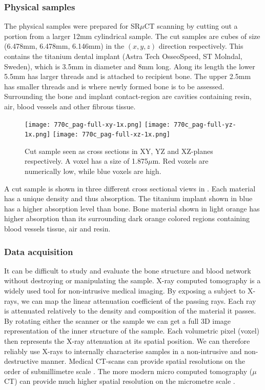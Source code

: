 \subsubsection{Physical samples}

The physical samples were prepared for SR$\mu$CT scanning by cutting out a portion from a larger
12mm cylindrical sample. The cut samples are cubes of size (6.478mm, 6.478mm, 6.146mm) in the
$(x,y,z)$ direction respectively. This contains the titanium dental implant (Astra Tech OsseoSpeed,
ST Molndal, Sweden), which is 3.5mm in diameter and 8mm long. Along its length the lower 5.5mm
has larger threads and is attached to recipient bone. The upper 2.5mm has smaller threads and
is where newly formed bone is to be assessed. Surrounding the bone and implant contact-region
are cavities containing resin, air, blood vessels and other fibrous tissue.

\begin{figure}
\centering
\texttt{[image: 770c\_pag-full-xy-1x.png]}
\texttt{[image: 770c\_pag-full-yz-1x.png]}
\texttt{[image: 770c\_pag-full-xz-1x.png]}
\caption{Cut sample seen as cross sections in XY, YZ and XZ-planes respectively. A voxel has a size
of 1.875$\mu$m. Red voxels are numerically low, while blue voxels are high.}
\label{fig:3viewsample}
\end{figure}

A cut sample is shown in three different cross sectional views in . Each
material has a unique density and thus absorption. The titanium implant shown in blue has a
higher absorption level than bone. Bone material shown in light orange has higher absorption
than its surrounding dark orange colored regions containing blood vessels tissue, air and resin.

\subsubsection{Data acquisition}

It can be difficult to study and evaluate the bone structure and blood network without destroying
or manipulating the sample. X-ray computed tomography is a widely used tool for non-intrusive medical
imaging. By exposing a subject to X-rays, we can map the linear attenuation coefficient of the passing
rays. Each ray is attenuated relatively to the density and composition of the material it passes.
By rotating either the scanner or the sample we can get a full 3D image representation of the inner
structure of the sample. Each volumetric pixel (voxel) then represents the X-ray attenuation at its
spatial position. We can therefore reliably use X-rays to internally characterise samples in a
non-intrusive and non-destructive manner. Medical CT-scans can provide spatial resolutions on the
order of submillimetre scale \citep{medicalct}. The more modern micro computed tomography ($\mu$CT)
can provide much higher spatial resolution on the micrometre scale \citep{srexptime}.


